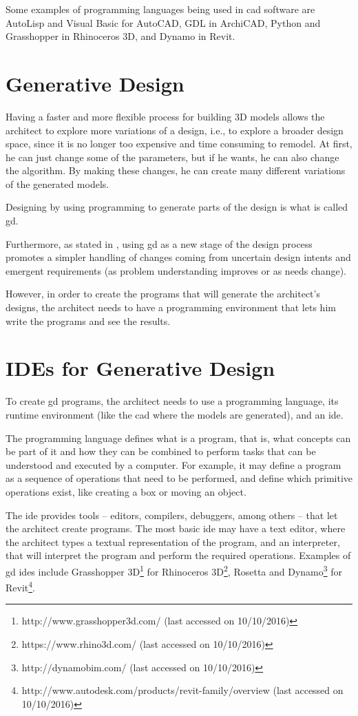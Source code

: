 Some examples of programming languages being used in \gls{cad} software are AutoLisp and Visual Basic for AutoCAD, GDL in ArchiCAD, Python and Grasshopper in Rhinoceros 3D, and Dynamo in Revit.


\section{Generative Design}
Having a faster and more flexible process for building 3D models allows the architect to explore more variations of a design, i.e., to explore a broader design space, since it is no longer too expensive and time consuming to remodel.
At first, he can just change some of the parameters, but if he wants, he can also change the algorithm.
By making these changes, he can create many different variations of the generated models.

Designing by using programming to generate parts of the design is what is called \gls{gd}.

Furthermore, as stated in \cite{leitao2014pushing}, using \gls{gd} as a new stage of the design process promotes a simpler handling of changes coming from uncertain design intents and emergent requirements (as problem understanding improves or as needs change).


However, in order to create the programs that will generate the architect's designs, the architect needs to have a programming environment that lets him write the programs and see the results.


\section{IDEs for Generative Design}
To create \gls{gd} programs, the architect needs to use a programming language, its runtime environment (like the \gls{cad} where the models are generated), and an \gls{ide}.

The programming language defines what is a program, that is, what concepts can be part of it and how they can be combined to perform tasks that can be understood and executed by a computer.
For example, it may define a program as a sequence of operations that need to be performed, and define which primitive operations exist, like creating a box or moving an object.

The \gls{ide} provides tools -- editors, compilers, debuggers, among others -- that let the architect create programs.
The most basic \gls{ide} may have a text editor, where the architect types a textual representation of the program, and an interpreter, that will interpret the program and perform the required operations.
Examples of \gls{gd} \glspl{ide} include Grasshopper 3D\footnote{http://www.grasshopper3d.com/ (last accessed on 10/10/2016)} for Rhinoceros 3D\footnote{https://www.rhino3d.com/ (last accessed on 10/10/2016)}, Rosetta\cite{de2012modern} and Dynamo\footnote{http://dynamobim.com/ (last accessed on 10/10/2016)} for Revit\footnote{http://www.autodesk.com/products/revit-family/overview (last accessed on 10/10/2016)}.

